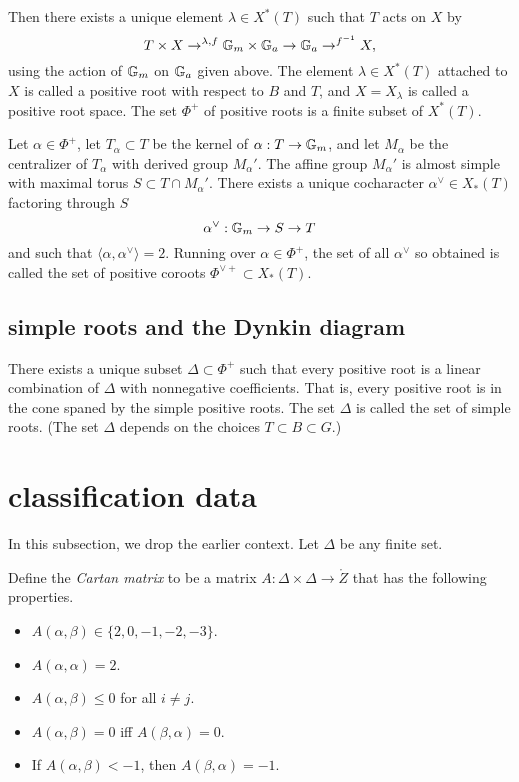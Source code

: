 Then there exists a
unique element $\lambda\in X^*(T)$ such that $T$ acts on $X$ by
\[
T\times X\to^{\lambda,f} {\Bbb G}_m \times {\Bbb G}_a
\to {\Bbb G}_a \to^{f^{-1}} X,
\]
using the action of ${\Bbb G}_m$ on ${\Bbb G}_a$ given above.  The element
$\lambda\in X^*(T)$ attached to $X$ is called a positive root with
respect to $B$ and $T$, and $X = X_\lambda$ is called a positive root
space.  The set $\Phi^+$ of positive roots is a finite subset of
$X^*(T)$.

Let $\alpha\in\Phi^+$, let
$T_\alpha\subset T$ be the kernel of $\alpha: T\to {\Bbb G}_m$, and let
$M_\alpha$ be the centralizer of $T_\alpha$ with derived group
$M_\alpha'$.  The affine group $M_\alpha'$ is almost simple with
maximal torus $S \subset T \cap M_\alpha'$.  There exists a unique
cocharacter $\alpha^\vee\in X_*(T)$ factoring through $S$
\[
\alpha^\vee:{\Bbb G}_m\to S \to T
\]
and such that $\langle \alpha,\alpha^\vee\rangle = 2$.  Running over
$\alpha\in \Phi^+$, the set of all $\alpha^\vee$ so obtained is called the
set of positive coroots $\Phi^{\vee+}\subset X_*(T)$.


\subsection{simple roots and the Dynkin diagram}

There exists a unique subset $\Delta\subset \Phi^+$ such that every
positive root is a linear combination of $\Delta$ with nonnegative
coefficients.  That is, every positive root is in the cone spaned by
the simple positive roots.  The set $\Delta$ is called the set of
simple roots.  (The set $\Delta$ depends on the choices $T\subset
B\subset G$.)


\section{classification data}

In this subsection, we drop the earlier context.
Let $\Delta$ be any finite set.


Define the {\it Cartan matrix} to be a matrix $A:\Delta\times \Delta\to\ring{Z}$
that has the following properties.
\begin{itemize}
\item $A(\alpha,\beta)\in \{2,0,-1,-2,-3\}$.
\item $A(\alpha,\alpha)=2$.
\item $A(\alpha,\beta)\le 0$ for all $i\ne j$.
\item $A(\alpha,\beta)=0$ iff $A(\beta,\alpha)=0$.
\item If $A(\alpha,\beta)<-1$, then $A(\beta,\alpha)=-1$.
  \end{itemize}

